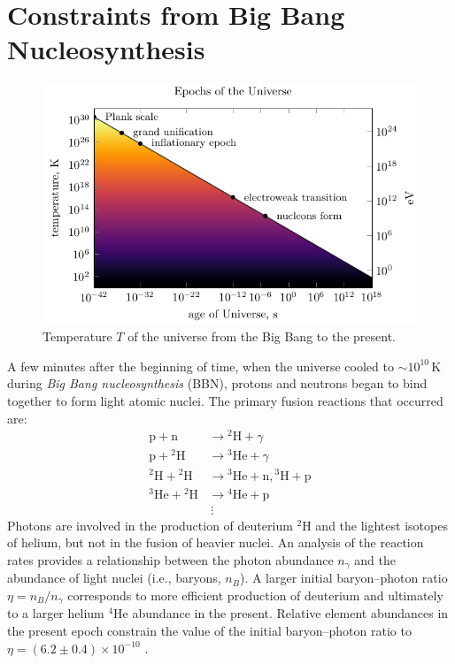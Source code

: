 \section{Constraints from Big Bang Nucleosynthesis}

\begin{figure}
	\centering
	\includegraphics{diagrams/big-history.pdf}
	\caption{Temperature $T$ of the universe from the Big Bang to the present.}
\end{figure}

A few minutes after the beginning of time, when the universe cooled to $\sim 10^{10}\,\si{\K}$ during \emph{Big Bang nucleosynthesis} (BBN), protons and neutrons began to bind together to form light atomic nuclei.
The primary fusion reactions that occurred are:
\begin{align}
	\mathrm{p + n} &\to \mathrm{{}^2H} + γ
\\	\mathrm{p + {}^2H} &\to \mathrm{{}^3He} + γ
\\	\mathrm{{}^2H + {}^2H} &\to \mathrm{{}^3He + n, {}^3H + p}
\\	\mathrm{{}^3He + {}^2H} &\to \mathrm{{}^4He + p}
\\	&\ \vdots
\end{align}
Photons are involved in the production of deuterium $^2\mathrm H$ and the lightest isotopes of helium, but not in the fusion of heavier nuclei.
An analysis of the reaction rates provides a relationship between the photon abundance $n_γ$ and the abundance of light nuclei (i.e., baryons, $n_B$).
A larger initial baryon--photon ratio $η = n_B/n_γ$ corresponds to more efficient production of deuterium and ultimately to a larger helium $^4\mathrm{He}$ abundance in the present.
Relative element abundances in the present epoch constrain the value of the initial baryon--photon ratio to $η = (6.2 \pm 0.4) \times 10^{-10}$ \cite[§\,24.4]{ParticleDataGroup-review-2020}.


